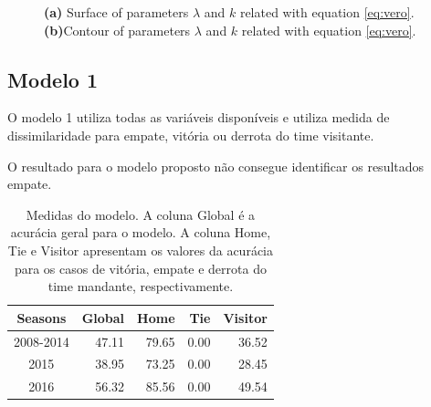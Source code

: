 \documentclass[review]{elsarticle}
\begin{document}
\begin{figure}%
    \centering
    \qquad
    \caption[\scriptsize{Tunning parameters.}]{\scriptsize{ \textbf{(a)} Surface of parameters $\lambda$ and $k$ related with equation \ref{eq:vero}.\textbf{(b)}Contour of parameters $\lambda$ and $k$ related with equation \ref{eq:vero}.}}
    \label{fig:tunning}%
\end{figure}


\subsection{Modelo 1}
\label{sec:mod1}

O modelo 1 utiliza todas as variáveis disponíveis e utiliza medida de dissimilaridade para empate, vitória ou derrota do time visitante.



O resultado para o modelo proposto não consegue identificar os resultados empate.

\begin{table}[ht]
\centering
\begin{tabular}{crrrr}
  \hline
Seasons & Global & Home & Tie & Visitor \\ 
  \hline
2008-2014 & 47.11 & 79.65 & 0.00 & 36.52 \\ 
  2015 & 38.95 & 73.25 & 0.00 & 28.45 \\ 
  2016 & 56.32 & 85.56 & 0.00 & 49.54 \\ 
   \hline
\end{tabular}
    \caption[\scriptsize{Medidas do modelo.}]{\scriptsize{Medidas do modelo. A coluna Global é a acurácia geral para o modelo. A coluna Home, Tie e Visitor apresentam os valores da acurácia para os casos de vitória, empate e derrota do time mandante, respectivamente.}}
    \label{tab:medidasmod}
\end{table}
\end{document}

